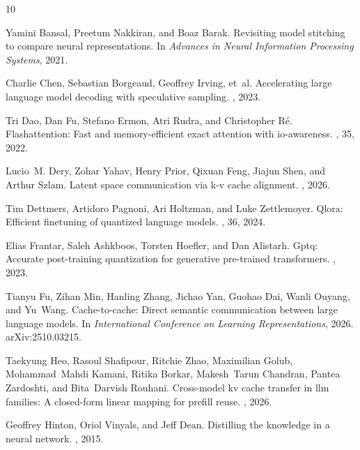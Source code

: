 \documentclass[11pt]{article}
\begin{document}
\begin{thebibliography}{10}

Yamini Bansal, Preetum Nakkiran, and Boaz Barak.
\newblock Revisiting model stitching to compare neural representations.
\newblock In {\em Advances in Neural Information Processing Systems}, 2021.

Charlie Chen, Sebastian Borgeaud, Geoffrey Irving, et~al.
\newblock Accelerating large language model decoding with speculative sampling.
, 2023.

Tri Dao, Dan Fu, Stefano Ermon, Atri Rudra, and Christopher R{\'e}.
\newblock Flashattention: Fast and memory-efficient exact attention with
  io-awareness.
, 35, 2022.

Lucio~M. Dery, Zohar Yahav, Henry Prior, Qixuan Feng, Jiajun Shen, and Arthur
  Szlam.
\newblock Latent space communication via k-v cache alignment.
, 2026.

Tim Dettmers, Artidoro Pagnoni, Ari Holtzman, and Luke Zettlemoyer.
\newblock Qlora: Efficient finetuning of quantized language models.
, 36, 2024.

Elias Frantar, Saleh Ashkboos, Torsten Hoefler, and Dan Alistarh.
\newblock Gptq: Accurate post-training quantization for generative pre-trained
  transformers.
, 2023.

Tianyu Fu, Zihan Min, Hanling Zhang, Jichao Yan, Guohao Dai, Wanli Ouyang, and
  Yu~Wang.
\newblock Cache-to-cache: Direct semantic communication between large language
  models.
\newblock In {\em International Conference on Learning Representations}, 2026.
\newblock arXiv:2510.03215.

Taekyung Heo, Rasoul Shafipour, Ritchie Zhao, Maximilian Golub, Mohammad~Mahdi
  Kamani, Ritika Borkar, Makesh~Tarun Chandran, Pantea Zardoshti, and
  Bita~Darvish Rouhani.
\newblock Cross-model kv cache transfer in llm families: A closed-form linear
  mapping for prefill reuse.
, 2026.

Geoffrey Hinton, Oriol Vinyals, and Jeff Dean.
\newblock Distilling the knowledge in a neural network.
, 2015.


\end{thebibliography}
\end{document}
